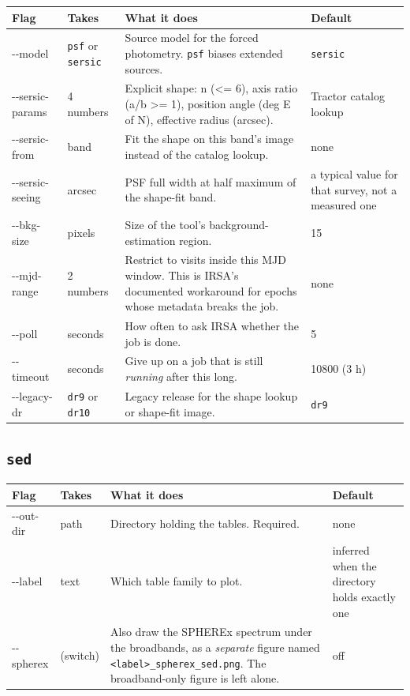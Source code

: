 \documentclass[11pt]{article}
\begin{document}
\begin{longtable}{T{2.9cm} L{2.15cm} L{6.45cm} L{2.7cm}}
\toprule
\textbf{\normalfont Flag} & \textbf{Takes} & \textbf{What it does} & \textbf{Default} \\
\midrule
\endhead
-{}-model & \texttt{psf} or \texttt{sersic} & Source model for the forced
  photometry. \texttt{psf} biases extended sources. & \texttt{sersic} \\[2pt]
-{}-sersic-\newline params & 4 numbers & Explicit shape: n (<= 6), axis ratio
  (a/b >= 1), position angle (deg E of N), effective radius (arcsec). &
  Tractor catalog lookup \\[2pt]
-{}-sersic-from & band & Fit the shape on this band's image instead of the
  catalog lookup. & none \\[2pt]
-{}-sersic-\newline seeing & arcsec & PSF full width at half maximum of the
  shape-fit band. & a typical value for that survey, not a measured
  one \\[2pt]
-{}-bkg-size & pixels & Size of the tool's background-estimation region. &
  15 \\[2pt]
-{}-mjd-range & 2 numbers & Restrict to visits inside this MJD window.
  This is IRSA's documented workaround for epochs whose metadata breaks
  the job. & none \\[2pt]
-{}-poll & seconds & How often to ask IRSA whether the job is done. & 5 \\[2pt]
-{}-timeout & seconds & Give up on a job that is still \emph{running}
  after this long. & 10800 (3 h) \\[2pt]
-{}-legacy-dr & \texttt{dr9} or \texttt{dr10} & Legacy release for the
  shape lookup or shape-fit image. & \texttt{dr9} \\
\bottomrule
\end{longtable}

\subsection{\texttt{sed}}

\begin{longtable}{T{2.9cm} L{2.15cm} L{6.45cm} L{2.7cm}}
\toprule
\textbf{\normalfont Flag} & \textbf{Takes} & \textbf{What it does} & \textbf{Default} \\
\midrule
\endhead
-{}-out-dir & path & Directory holding the tables. Required. & none \\[2pt]
-{}-label & text & Which table family to plot. & inferred when the
  directory holds exactly one \\[2pt]
-{}-spherex & (switch) & Also draw the SPHEREx spectrum under the
  broadbands, as a \emph{separate} figure named
  \texttt{<label>\_spherex\_sed.png}. The broadband-only figure is left
  alone. & off \\
\bottomrule
\end{longtable}
\end{document}
